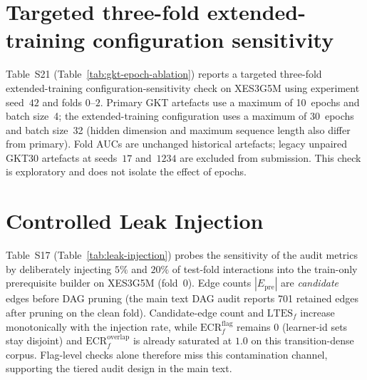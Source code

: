 \documentclass[preprint,11pt]{elsarticle}
\newcommand{\Epre}{\ensuremath{E_{\text{pre}}}}
\begin{document}
\section{Targeted three-fold extended-training configuration sensitivity}
\label{sec:supp-gkt-epoch}
Table~S21 (Table~\ref{tab:gkt-epoch-ablation}) reports a targeted three-fold
extended-training configuration-sensitivity check on XES3G5M using experiment
seed~$42$ and folds $0$--$2$. Primary GKT artefacts use a maximum of 10~epochs
and batch size~4; the extended-training configuration uses a maximum of
30~epochs and batch size~32 (hidden dimension and maximum sequence length also
differ from primary). Fold AUCs are unchanged historical artefacts;
legacy unpaired GKT30 artefacts at seeds~$17$ and~$1234$ are excluded from
submission. This check is exploratory and does not isolate the effect of epochs.
\begin{table}[h!]
\centering
\caption{Targeted three-fold extended-training configuration-sensitivity
check on XES3G5M using experiment seed~$42$. The primary GKT
configuration used a maximum of 10 epochs and batch size~4,
whereas the extended-training configuration used a maximum of
30 epochs and batch size~32. The observed mean AUC was $0.003451$
higher under the extended-training configuration; however, the
approximate 95\% confidence interval $[-0.004, 0.011]$ included zero.
Because maximum epochs, batch size, hidden dimension, and sequence length
all changed, this exploratory comparison does not isolate the effect of epochs.}
\label{tab:gkt-epoch-ablation}

\end{table}

\section{Controlled Leak Injection}
\label{sec:supp-leak-injection}
Table~S17 (Table~\ref{tab:leak-injection}) probes the sensitivity of the
audit metrics by deliberately injecting $5\%$ and $20\%$ of test-fold
interactions into the train-only prerequisite builder on XES3G5M (fold~0).
Edge counts $|\Epre|$ are \emph{candidate} edges before DAG pruning (the
main text DAG audit reports 701 retained edges after pruning on the clean
fold). Candidate-edge count and $\mathrm{LTES}_f$ increase monotonically with the
injection rate, while $\mathrm{ECR}^{\mathrm{flag}}_f$ remains $0$ (learner-id
sets stay disjoint) and $\mathrm{ECR}^{\mathrm{overlap}}_f$ is already
saturated at $1.0$ on this transition-dense corpus. Flag-level checks alone
therefore miss this contamination channel, supporting the tiered audit design
in the main text.
\begin{table}[h!]
\centering
\caption{Controlled Leak Injection, XES3G5M fold~0. $|\Epre|$ counts candidate edges before DAG pruning. (Table S17)}
\label{tab:leak-injection}

\end{table}
\end{document}
